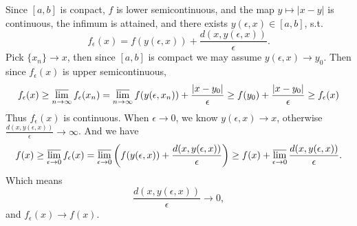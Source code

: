 \documentclass{article}%
\begin{document}
\begin{enumerate}
Since $[a, b]$ is conpact, $f$ is lower semicontinuous, and the map $y\mapsto |x-y|$ is continuous, the infimum is attained, and there exists $y(\epsilon, x) \in [a, b]$, s.t.
$$
f_\epsilon(x) = f(y(\epsilon, x)) + \frac{d(x, y(\epsilon, x))}{\epsilon}.
$$
Pick $\{x_n\}\to x$, then since $[a, b]$ is compact we may assume $y(\epsilon, x) \to y_{0}$. Then since $f_{\epsilon}(x)$ is upper semicontinuous, 
$$
f_\epsilon(x)\ge \varlimsup_{n\to\infty}f_\epsilon(x_n) = \varlimsup_{n\to\infty}f(y(\epsilon, x_n)) + \frac{|x-y_0|}{\epsilon} \ge f(y_0) +\frac{|x-y_0|}{\epsilon} \ge f_\epsilon(x)
$$
Thus $f_\epsilon(x) $ is continuous. When $\epsilon\to 0$, we know $y(\epsilon, x) \to x$, otherwise $\frac{d(x, y(\epsilon, x))}{\epsilon}\to\infty$. And we have
$$
f(x) \ge \varlimsup_{\epsilon \to 0}f_\epsilon(x) = \varlimsup_{\epsilon\to 0}\left(f(y(\epsilon, x))+\frac{d(x, y(\epsilon, x))}{\epsilon}\right) \ge f(x) + \varlimsup_{\epsilon\to 0}\frac{d(x, y(\epsilon, x))}{\epsilon}.
$$
Which means $$\frac{d(x, y(\epsilon, x))}{\epsilon}\to 0,$$
and $f_\epsilon(x) \to f(x)$.
\bigskip






\end{enumerate}
\end{document}
